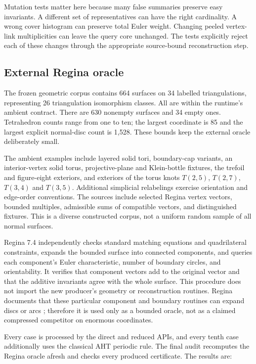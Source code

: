 Mutation tests matter here because many false summaries preserve easy
invariants. A different set of representatives can have the right
cardinality. A wrong cover histogram can preserve total Euler weight.
Changing peeled vertex-link multiplicities can leave the query core
unchanged. The tests explicitly reject each of these changes through the
appropriate source-bound reconstruction step.

\subsection{External Regina oracle}

The frozen geometric corpus contains 664 surfaces on 34 labelled
triangulations, representing 26 triangulation isomorphism classes.
All are within the runtime's ambient contract. There are 630 nonempty
surfaces and 34 empty ones. Tetrahedron counts range from one to ten;
the largest coordinate is 85 and the largest explicit normal-disc count
is 1,528. These bounds keep the external oracle deliberately small.

The ambient examples include layered solid tori, boundary-cap variants,
an interior-vertex solid torus, projective-plane and Klein-bottle fixtures,
the trefoil and figure-eight exteriors, and exteriors of the torus knots
$T(2,5)$, $T(2,7)$, $T(3,4)$ and $T(3,5)$. Additional simplicial
relabelings exercise orientation and edge-order conventions. The sources
include selected Regina vertex vectors, bounded multiples, admissible sums
of compatible vectors, and distinguished fixtures. This is a diverse
constructed corpus, not a uniform random sample of all normal surfaces.

Regina 7.4 independently checks standard matching equations and
quadrilateral constraints, expands the bounded surface into connected
components, and queries each component's Euler characteristic, number of
boundary circles, and orientability. It verifies that component vectors
add to the original vector and that the additive invariants agree with
the whole surface. This procedure does not import the new producer's
geometry or reconstruction routines. Regina documents that these
particular component and boundary routines can expand discs or arcs
\cite{regina}; therefore it is used only as a bounded oracle, not as a
claimed compressed competitor on enormous coordinates.

Every case is processed by the direct and reduced APIs, and every tenth
case additionally uses the classical AHT periodic rule. The final audit
recomputes the Regina oracle afresh and checks every produced certificate.
The results are:

